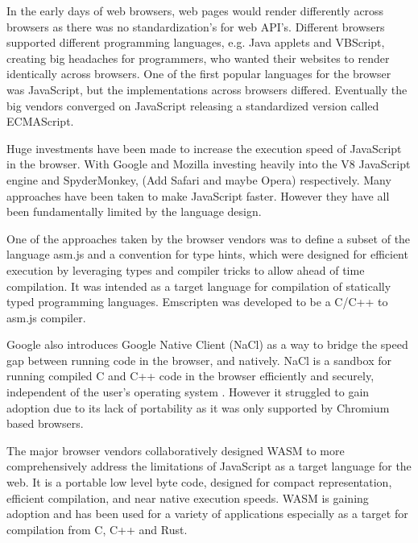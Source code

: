 \documentclass[11pt]{book}
\begin{document}
In the early days of web browsers, web pages would render differently across browsers as there was no standardization's for web API's. Different browsers supported different programming languages, e.g. Java applets and VBScript, creating big headaches for programmers, who wanted their websites to render identically across browsers. One of the first popular languages for the browser was JavaScript, but the implementations across browsers differed. Eventually the big vendors converged on JavaScript releasing a standardized version called ECMAScript. 

Huge investments have been made to increase the execution speed of JavaScript in the browser. With Google and Mozilla investing heavily into the V8 JavaScript engine and SpyderMonkey, (Add Safari and maybe Opera) respectively. Many approaches have been taken to make JavaScript faster. However they have all been fundamentally limited by the language design. 


One of the approaches taken by the browser vendors was to define a subset of the language asm.js and a convention for type hints, which were designed for efficient execution by leveraging types and compiler tricks to allow ahead of time compilation. It was intended as a target language for compilation of statically typed programming languages. Emscripten \cite{emcc} was developed to be a C/C++ to asm.js compiler. 

Google also introduces Google Native Client (NaCl)\cite{nacl} as a way to bridge the speed gap between running code in the browser, and natively. NaCl is a sandbox for running compiled C and C++ code in the browser efficiently and securely, independent of the user’s operating system \cite{nacl}. However it struggled to gain adoption due to its lack of portability as it was only supported by Chromium based browsers. 


The major browser vendors collaboratively designed WASM \cite{wasm_og} to more comprehensively address the limitations of JavaScript as a target language for the web. It is a portable low level byte code, designed for compact representation, efficient compilation, and near native execution speeds. WASM is gaining adoption and has been used for a variety of applications especially as a target for compilation from C, C++ and Rust. 
\end{document}
